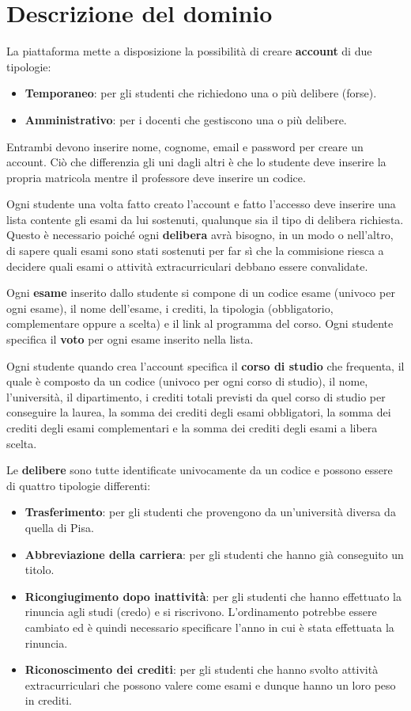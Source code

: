 \section{Descrizione del dominio}
La piattaforma mette a disposizione la possibilità di creare \textbf{account} di due tipologie:
\begin{itemize}
	\item \textbf{Temporaneo}: per gli studenti che richiedono una o più delibere (forse).
	\item \textbf{Amministrativo}: per i docenti che gestiscono una o più delibere.
\end{itemize}
Entrambi devono inserire nome, cognome, email e password per creare un account. Ciò che differenzia
gli uni dagli altri è che lo studente deve inserire la propria matricola mentre il professore deve
inserire un codice.

Ogni studente una volta fatto creato l'account e fatto l'accesso deve inserire una lista contente
gli esami da lui sostenuti, qualunque sia il tipo di delibera richiesta. Questo è necessario poiché
ogni \textbf{delibera} avrà bisogno, in un modo o nell'altro, di sapere quali esami sono stati
sostenuti per far sì che la commisione riesca a decidere quali esami o attività extracurriculari
debbano essere convalidate.

Ogni \textbf{esame} inserito dallo studente si compone di un codice esame (univoco per ogni esame),
il nome dell'esame, i crediti, la tipologia (obbligatorio, complementare oppure a scelta) e il link
al programma del corso. Ogni studente specifica il \textbf{voto} per ogni esame inserito nella
lista.

Ogni studente quando crea l'account specifica il \textbf{corso di studio} che frequenta, il quale
è composto da un codice (univoco per ogni corso di studio), il nome, l'università, il dipartimento,
i crediti totali previsti da quel corso di studio per conseguire la laurea, la somma dei crediti
degli esami obbligatori, la somma dei crediti degli esami complementari e la somma dei crediti
degli esami a libera scelta.

Le \textbf{delibere} sono tutte identificate univocamente da un codice e possono essere di quattro
tipologie differenti:
\begin{itemize}
	\item \textbf{Trasferimento}: per gli studenti che provengono da un'università diversa da
	      quella di Pisa.
	\item \textbf{Abbreviazione della carriera}: per gli studenti che hanno già conseguito un
	      titolo.
	\item \textbf{Ricongiugimento dopo inattività}: per gli studenti che hanno effettuato la
	      rinuncia agli studi (credo) e si riscrivono. L'ordinamento potrebbe essere cambiato ed
	      è quindi necessario specificare l'anno in cui è stata effettuata la rinuncia.
	\item \textbf{Riconoscimento dei crediti}: per gli studenti che hanno svolto attività
	      extracurriculari che possono valere come esami e dunque hanno un loro peso in crediti.
\end{itemize}
